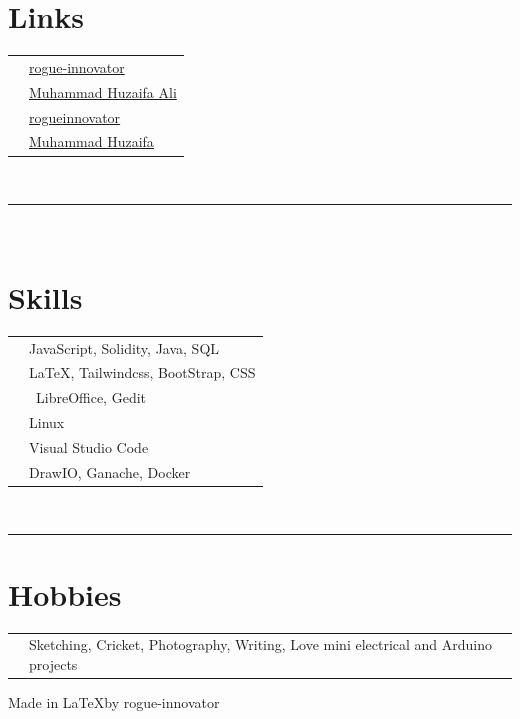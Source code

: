 \documentclass[oneside]{article}
\begin{document}
{\begin{minipage}[t][\textheight-2\fboxsep-2\fboxrule][t]{\dimexpr0.40\textwidth-2\fboxrule-2\fboxsep\relax}
        \section*{\large Links}
        \begin{tabular}{cl}
            \faGithub{}   & \href{https://github.com/rogueinnovator}{rogue-innovator}                                \\
            \faLinkedin{} & \href{https://www.linkedin.com/in/muhammad-huzaifa-ali-49aa94259/}{Muhammad Huzaifa Ali} \\
            \faTwitter{}  & \href{https://www.twitter.com/in/rogue-innovator}{rogueinnovator}                        \\
            \faSlack{}    & \href{https://app.slack.com/client/T06MHHWUB7E/C06M8HF9REJ}{Muhammad Huzaifa}
        \end{tabular}
        \vspace{10pt} \\
        \rule{\linewidth}{0.4pt} \\
        \section*{\large Skills}
        \begin{tabularx}{\textwidth}{cY}
            \faCode{}       & JavaScript, Solidity, Java, SQL     \\
            \faPen*{}       & \LaTeX, Tailwindcss, BootStrap, CSS \\
            \faFont{}       & \ LibreOffice, Gedit                \\
            \faCogs{}       & Linux \hspace{4pt}  \faLinux{}      \\
            \faLaptopCode{} & Visual Studio Code                  \\
            \faToolbox{}    & DrawIO, Ganache, Docker
        \end{tabularx}
        \vspace{1pt} \\
        \rule{\linewidth}{0.4pt}
        \section*{\large Hobbies}
        \begin{tabularx}{\textwidth}{cY}
            \faUsers{} & Sketching, Cricket, Photography, Writing, Love mini electrical and Arduino projects \\
        \end{tabularx}
        \vfill
        {\tiny Made in \LaTeX by rogue-innovator}

    \end{minipage}
}
\hfill
{}
\end{document}
